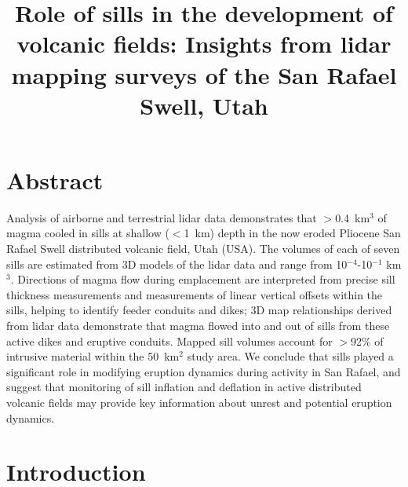\documentclass[12pt,letter]{article}
\title{Role of sills in the development of volcanic fields: Insights from lidar mapping surveys of the San Rafael Swell, Utah}
\date{}
\author{}
\begin{document}
\maketitle

\section{Abstract}

Analysis of airborne and terrestrial lidar data demonstrates that $>$0.4~km$^3$ of magma cooled in sills at shallow ($<$1~km) depth in the now eroded Pliocene San Rafael Swell distributed volcanic field, Utah (USA). The volumes of each of seven sills are estimated from 3D models of the lidar data and range from 10$^{-4}$-10$^{-1}$ km$^3$. Directions of magma flow during emplacement are interpreted from precise sill thickness measurements and measurements of linear vertical offsets within the sills, helping to identify feeder conduits and dikes; 3D map relationships derived from lidar data demonstrate that magma flowed into and out of sills from these active dikes and eruptive conduits. Mapped sill volumes account for $>$92\% of intrusive material within the 50~km$^2$ study area. We conclude that sills played a significant role in modifying eruption dynamics during activity in San Rafael, and suggest that monitoring of sill inflation and deflation in active distributed volcanic fields may provide key information about unrest and potential eruption dynamics.


\section{Introduction}
\end{document}
